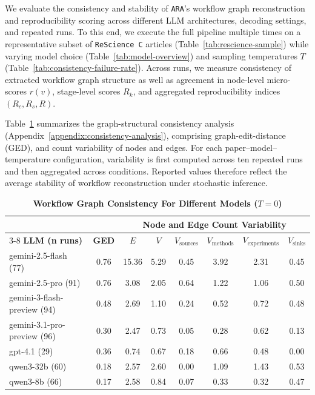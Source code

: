 \documentclass{article}
\begin{document}


We evaluate the consistency and stability of \texttt{ARA}'s workflow graph reconstruction and reproducibility scoring across different LLM architectures, decoding settings, and repeated runs.
To this end, we execute the full pipeline multiple times on a representative subset of \texttt{ReScience C} articles (Table~\ref{tab:rescience-sample}) while varying model choice (Table~\ref{tab:model-overview}) and sampling temperatures $T$ (Table~\ref{tab:consistency-failure-rate}).
Across runs, we measure consistency of extracted workflow graph structure as well as agreement in node-level micro-scores $r(v)$, stage-level scores $R_k$, and aggregated reproducibility indices $(R_c, R_s, R)$.

Table~\ref{tab:workflow-consistency-graph} summarizes the graph-structural consistency analysis (Appendix~\ref{appendix:consistency-analysis}), comprising graph-edit-distance (GED), and count variability of nodes and edges.
For each paper--model--temperature configuration, variability is first computed across ten repeated runs and then aggregated across conditions.
Reported values therefore reflect the average stability of workflow reconstruction under stochastic inference.

\begin{table}[!ht]
\centering
\caption{\textbf{Workflow Graph Consistency For Different Models ($T=0$)}}
\label{tab:workflow-consistency-graph}
\begin{tabular}{lccccccc}
\toprule
 & & \multicolumn{6}{c}{\textbf{Node and Edge Count Variability}} \\
\cmidrule(lr){3-8}
\textbf{LLM (n runs)} & \textbf{GED} & {$E$} & {$V$} & {$V_{\text{sources}}$} & {$V_{\text{methods}}$} & {$V_{\text{experiments}}$} & {$V_{\text{sinks}}$} \\
\midrule
gemini-2.5-flash (77)       & 0.76 & 15.36 & 5.29 & 0.45 & 3.92 & 2.31 & 0.45 \\
gemini-2.5-pro (91)         & 0.76 & 3.08  & 2.05 & 0.64 & 1.22 & 1.06 & 0.50 \\
gemini-3-flash-preview (94) & 0.48 & 2.69  & 1.10 & 0.24 & 0.52 & 0.72 & 0.48 \\
gemini-3.1-pro-preview (96) & 0.30 & 2.47  & 0.73 & 0.05 & 0.28 & 0.62 & 0.13 \\
gpt-4.1 (29)                & 0.36 & 0.74  & 0.67 & 0.18 & 0.66 & 0.48 & 0.00 \\
\midrule
qwen3-32b (60)              & 0.18 & 2.57  & 2.60 & 0.00 & 1.09 & 1.43 & 0.53 \\
qwen3-8b (66)               & 0.17 & 2.58  & 0.84 & 0.07 & 0.33 & 0.32 & 0.47 \\
\bottomrule
\end{tabular}
\end{table}
\end{document}
